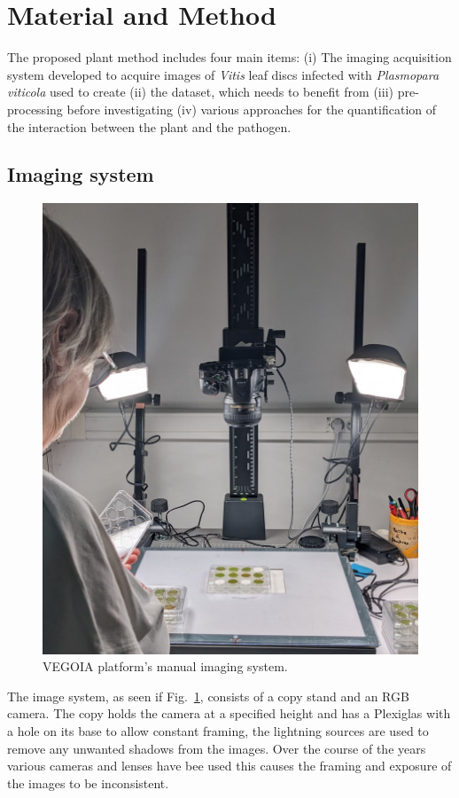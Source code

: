 \documentclass[english]{article}
\begin{document}
\section{Material and Method}

The proposed plant method includes four main items: (i) The imaging acquisition system developed to acquire images of \textit{Vitis} leaf discs infected with \textit{Plasmopara viticola} used to create (ii) the dataset, which needs to benefit from (iii) pre-processing before investigating (iv) various approaches for the quantification of the interaction between the plant and the pathogen.

\subsection{Imaging system}

\begin{figure}[H]
    \begin{center}
        \includegraphics[width=0.5\linewidth]{2023_a_oiv_imaging_system.jpg}
        \caption{VEGOIA platform's manual imaging system.}\label{fig:vegoia}
    \end{center}
\end{figure}
The image system, as seen if Fig.~\ref{fig:vegoia}, consists of a copy stand and an RGB camera. The copy holds the camera at a specified height and has a Plexiglas with a hole on its base to allow constant framing, the lightning sources are used to remove any unwanted shadows from the images. Over the course of the years various cameras and lenses have bee used this causes the framing and exposure of the images to be inconsistent.
\end{document}
